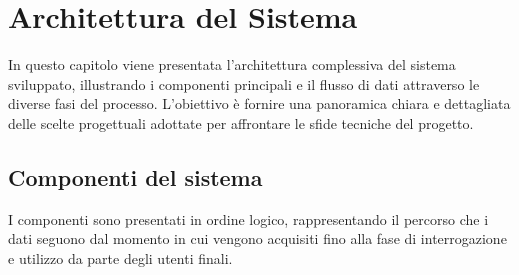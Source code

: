 \chapter{Architettura del Sistema}\label{chap:second}

\inlineminitoc

In questo capitolo viene presentata l'architettura complessiva del sistema sviluppato, illustrando i componenti principali e il flusso di dati attraverso le diverse fasi del processo. L'obiettivo è fornire una panoramica chiara e dettagliata delle scelte progettuali adottate per affrontare le sfide tecniche del progetto.

\section{Componenti del sistema}
I componenti sono presentati in ordine logico, rappresentando il percorso che i dati seguono dal momento in cui vengono acquisiti fino alla fase di interrogazione e utilizzo da parte degli utenti finali.


